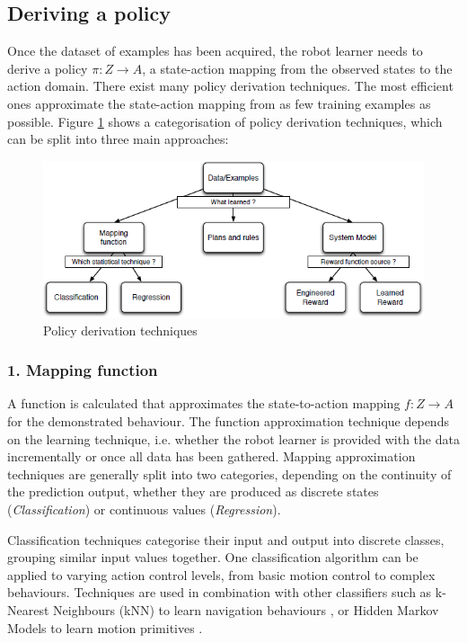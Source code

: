 \subsection{Deriving a policy}\label{subsec:Deriving a policy}
Once the dataset of examples has been acquired, the robot learner needs to derive a policy $\pi : Z \rightarrow A$, a state-action mapping  from the observed states to the action domain.
There exist many policy derivation techniques.
The most efficient ones approximate the state-action mapping from as few training examples as possible.
Figure \ref{fig:Learning-techniques} \cite{argall2009survey} shows a categorisation of policy derivation techniques, which can be split into three main approaches:
  \begin{figure}[!h]
    \centering
    \includegraphics[scale=0.75]{figures/Learning-techniques}
    \caption{Policy derivation techniques}
    \label{fig:Learning-techniques}
  \end{figure}

\subsubsection{1. Mapping function} 
A function is calculated that approximates the state-to-action mapping $f : Z \rightarrow A$ for the demonstrated behaviour. The function approximation technique depends on the learning technique, i.e. whether the robot learner is provided with the data incrementally or once all data has been gathered. Mapping approximation techniques are generally split into two categories, depending on the continuity of the prediction output, whether they are produced as discrete states (\textit{Classification}) or continuous values (\textit{Regression}).\cite{argall2009survey}

Classification techniques categorise their input and output into discrete classes, grouping similar input values together. One classification algorithm can be applied to varying action control levels, from basic motion control to complex behaviours. Techniques are used in combination with other classifiers such as k-Nearest Neighbours (kNN) to learn navigation behaviours \cite{saunders2006teaching}, or Hidden Markov Models \cite{hovland1996skill} to learn motion primitives \cite{rybski1999interactive}.

